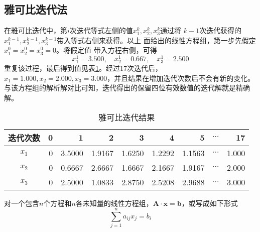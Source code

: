 
\subsection{雅可比迭代法}
在雅可比迭代中，第$i$次迭代等式左侧的值$x_{1}^{k}, x_{2}^{k},x_{3}^{k}$通过将
$k-1$次迭代获得的$x_{1}^{k-1}, x_{2}^{k-1},x_{3}^{k-1}$带入等式右侧来获得。以上
面给出的线性方程组，第一步先假定$x_{1}^{0} = x_{2}^{0} = x_{3}^{0}=0$。将假定值
带入方程右侧，可得
\begin{equation*}
x_{1}^{1}=3.500,\quad x_{2}^{1}=0.667,\quad x_{3}^{1}=2.500
\end{equation*}
重复该过程，最后得到值见表\ref{TbLA_Jacobi_result}。经过17次迭代后，
$x_{1}=1.000,x_{2}=2.000,x_{3}=3.000$，并且结果在增加迭代次数后不会有新的变化。
与该方程组的解析解对比可知，迭代得出的保留四位有效数值的迭代解就是精确解。
\begin{table}[!ht]
  \begin{center}
  \caption{雅可比迭代结果}
  \label{TbLA_Jacobi_result}
  \begin{tabular}{|c|r|r|r|r|r|r|r|r|}
    \hline
    迭代次数 & 0 & 1 & 2 & 3 & 4 & 5 & $\cdots$ & 17 \\
    \hline
    $x_{1}$ & 0 & 3.5000 & 1.9167 & 1.6250 & 1.2292 & 1.1563 & $\cdots$ & 1.000
    \\
    \hline
    $x_{2}$ & 0 & 0.6667 & 2.6667 & 1.6667 & 2.1667 & 1.9167 & $\cdots$ & 2.000
    \\
    \hline
    $x_{3}$ & 0 & 2.5000 & 1.0833 & 2.8750 & 2.5208 & 2.9688 & $\cdots$ & 3.000
    \\
    \hline
  \end{tabular}
  \end{center}
\end{table}

对一个包含$n$个方程和$n$各未知量的线性方程组，$\mathbf{A}\cdot \mathbf{x} =
\mathbf{b}$，或写成如下形式
\begin{equation}
  \sum_{j=1}^{n}a_{ij}x_{j} = b_{i}
\end{equation}

